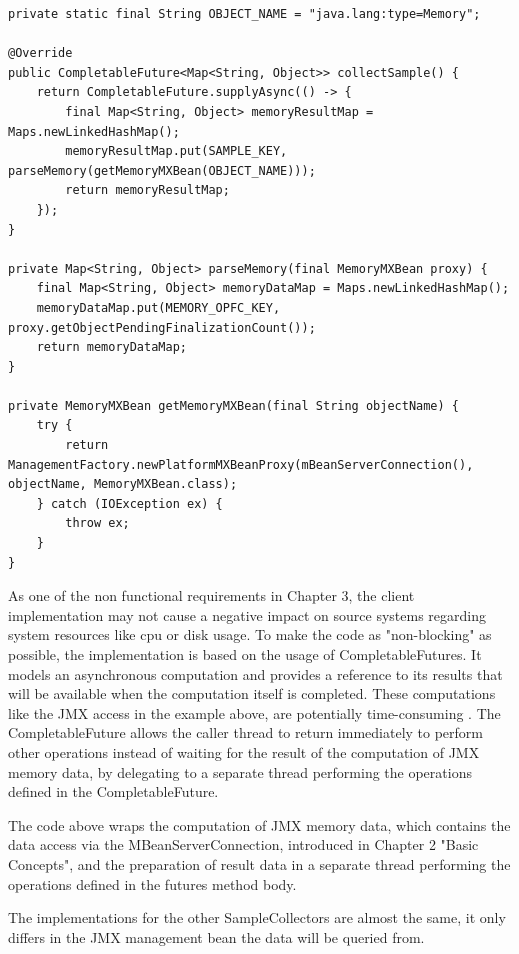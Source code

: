 \begin{lstlisting}[caption={MemorySampleCollector collectSample()}, captionpos=b, label={lst:memory-sample-collect}]
private static final String OBJECT_NAME = "java.lang:type=Memory";

@Override
public CompletableFuture<Map<String, Object>> collectSample() {
    return CompletableFuture.supplyAsync(() -> {
        final Map<String, Object> memoryResultMap = Maps.newLinkedHashMap();
        memoryResultMap.put(SAMPLE_KEY, parseMemory(getMemoryMXBean(OBJECT_NAME)));
        return memoryResultMap;
    });
}

private Map<String, Object> parseMemory(final MemoryMXBean proxy) {
    final Map<String, Object> memoryDataMap = Maps.newLinkedHashMap();
    memoryDataMap.put(MEMORY_OPFC_KEY, proxy.getObjectPendingFinalizationCount());
    return memoryDataMap;
}

private MemoryMXBean getMemoryMXBean(final String objectName) {
    try {
        return ManagementFactory.newPlatformMXBeanProxy(mBeanServerConnection(), objectName, MemoryMXBean.class);
    } catch (IOException ex) {
        throw ex;
    }
}
\end{lstlisting}

As one of the non functional requirements in Chapter 3, the client implementation may not cause a negative impact
on source systems regarding system resources like cpu or disk usage. To make the code as "non-blocking" as possible,
the implementation is based on the usage of CompletableFutures. It models an asynchronous computation and provides
a reference to its results that will be available when the computation itself is completed. These computations like the JMX
access in the example above, are potentially time-consuming \cite{Java8}. The CompletableFuture allows the caller thread to return immediately
to perform other operations instead of waiting for the result of the computation of JMX memory data, by delegating to a
separate thread performing the operations defined in the CompletableFuture.

The code above wraps the computation of JMX memory data, which contains the data access via the MBeanServerConnection,
introduced in Chapter 2 "Basic Concepts", and the preparation of result data in a separate thread performing the operations defined
in the futures method body.

The implementations for the other SampleCollectors are almost the same, it only differs in the JMX management bean the data will
be queried from.

